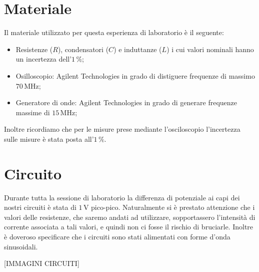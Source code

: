 \section*{Materiale}

Il materiale utilizzato per questa esperienza di laboratorio è il seguente:

\begin{itemize}
	\item{Resistenze ($R$), condensatori ($C$) e induttanze ($L$) i cui valori nominali hanno un incertezza dell'$1\,\%$;}
	\item{Osilloscopio: Agilent Technologies in grado di distiguere frequenze di massimo $70\,\si{\mega\hertz}$;}
	\item{Generatore di onde: Agilent Technologies in grado di generare frequenze massime di $15\,\si{\mega\hertz}$;}
\end{itemize}

Inoltre ricordiamo che per le misure prese mediante l'osciloscopio l'incertezza sulle misure è stata posta all'$1\,\%$.

\section*{Circuito}

Durante tutta la sessione di laboratorio la differenza di potenziale ai capi dei nostri circuiti è stata di $1\,\si{\volt}$ pico-pico. Naturalmente si è prestato attenzione che i valori delle resistenze, che saremo andati ad utilizzare, sopportassero l'intensità di corrente associata a tali valori, e quindi non ci fosse il rischio di bruciarle. Inoltre è doveroso specificare che i circuiti sono stati alimentati con forme d'onda sinusoidali.

[IMMAGINI CIRCUITI]



